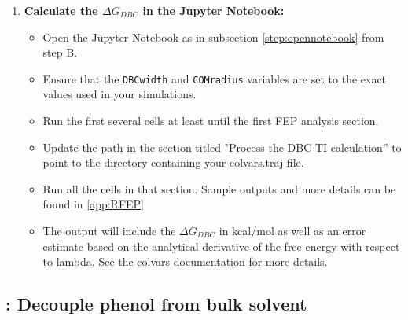 \documentclass[9pt,tutorial]{Styling/livecoms}
\newcommand{\textInput}[1]{
  \texttt{#1}
}
\begin{document}
\begin{enumerate}[label=\arabic*.]
\begin{enumerate}[label=\alph*., ref=\theenumi.\alph*]
\begin{itemize}
            \end{itemize}
            \item \textbf{Calculate the $\Delta G_{DBC}$ in the Jupyter Notebook:}
            \begin{itemize}
                \item Open the Jupyter Notebook as in subsection \ref{step:opennotebook} from step B.
                \item Ensure that the \textInput{DBCwidth} and \textInput{COMradius} variables are set to the exact values used in your simulations.
                \item Run the first several cells at least until the first FEP analysis section. 
                \item Update the path in the section titled "Process the DBC TI calculation'' to point to the directory containing your colvars.traj file.
                \item Run all the cells in that section. Sample outputs and more details can be found in \ref{app:RFEP}
                \item The output will include the $\Delta G_{DBC}$ in kcal/mol as well as an error estimate based on the analytical derivative of the free energy with respect to lambda. See the colvars documentation for more details.
            \end{itemize}
        \end{enumerate}
    \end{enumerate}
    
\subsection{\hspace{-1em}: Decouple phenol from bulk solvent}
\end{document}

